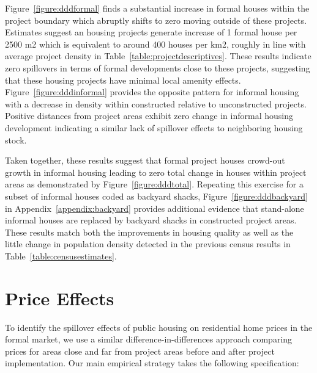 \documentclass[12pt]{article}
\begin{document}
Figure~\ref{figure:dddformal} finds a substantial increase in formal houses within the project boundary which abruptly shifts to zero moving outside of these projects.  Estimates suggest an housing projects generate increase of 1 formal house per 2500 m2 which is equivalent to around 400 houses per km2, roughly in line with average project density in Table~\ref{table:projectdescriptives}.  These results indicate zero spillovers in terms of formal developments close to these projects, suggesting that these housing projects have minimal local amenity effects.  Figure~\ref{figure:dddinformal} provides the opposite pattern for informal housing with a decrease in density within constructed relative to unconstructed projects.  Positive distances from project areas exhibit zero change in informal housing development indicating a similar lack of spillover effects to neighboring housing stock.  

Taken together, these results suggest that formal project houses crowd-out growth in informal housing leading to zero total change in houses within project areas as demonstrated by Figure~\ref{figure:dddtotal}.  Repeating this exercise for a subset of informal houses coded as backyard shacks, Figure~\ref{figure:dddbackyard} in Appendix~\ref{appendix:backyard} provides additional evidence that stand-alone informal houses are replaced by backyard shacks in constructed project areas.  These results match both the improvements in housing quality as well as the little change in population density detected in the previous census results in Table~\ref{table:censusestimates}.


\section{Price Effects}\label{section:resultsprices}

To identify the spillover effects of public housing on residential home prices in the formal market, we use a similar difference-in-differences approach comparing prices for areas close and far from project areas before and after project implementation.  Our main empirical strategy takes the following specification:
\end{document}
